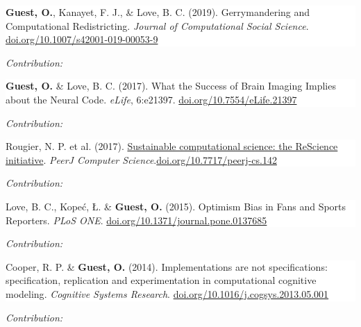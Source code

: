 \documentclass[10pt]{article}
\newcommand{\paper}[2]{\colorbox{white}{\begin{minipage}{\dimexpr\linewidth-2\fboxsep}#1
\end{minipage}}
\if\relax\detokenize{#2}\relax
    \vspace{2pt}
    \else
    \begin{flushright}
    \begin{minipage}{0.99\dimexpr\linewidth-2\fboxsep}\small
    \emph{Contribution:} #2
    \end{minipage}
    \end{flushright}
\fi
}
\begin{document}
\paper{\textbf{Guest, O.}, Kanayet, F. J., \& Love, B. C. (2019). {Gerrymandering and Computational Redistricting}. \textit{Journal of Computational Social Science}. \newline
\href{https://dx.doi.org/10.1007/s42001-019-00053-9}{doi.org/10.1007/s42001-019-00053-9}}
{}


\paper{
\textbf{Guest, O.} \& Love, B. C. (2017). {What the Success of Brain Imaging Implies about the Neural Code}. \textit{eLife}, 6:e21397. \newline
\href{http://dx.doi.org/10.7554/eLife.21397}{doi.org/10.7554/eLife.21397}
}{}

\paper{Rougier, N. P. et al. (2017). \href{http://dx.doi.org/10.7717/peerj-cs.142}{Sustainable computational science: the ReScience initiative}. \textit{PeerJ Computer Science}.\newline \href{http://dx.doi.org/10.7717/peerj-cs.142}{doi.org/10.7717/peerj-cs.142}}
{}

\paper{Love, B. C., Kopeć, Ł. \& \textbf{Guest, O.} (2015). {Optimism Bias in Fans and Sports Reporters}. \textit{PLoS ONE}. \newline
\href{http://dx.doi.org/10.1371/journal.pone.0137685}{doi.org/10.1371/journal.pone.0137685}}
{}

\paper{
Cooper, R. P. \& \textbf{Guest, O.} (2014).  {Implementations are not specifications: specification, replication and experimentation in computational cognitive modeling}. \textit{Cognitive Systems Research}. \newline
\href{http://dx.doi.org/10.1016/j.cogsys.2013.05.001}{doi.org/10.1016/j.cogsys.2013.05.001}}
{}
\end{document}
